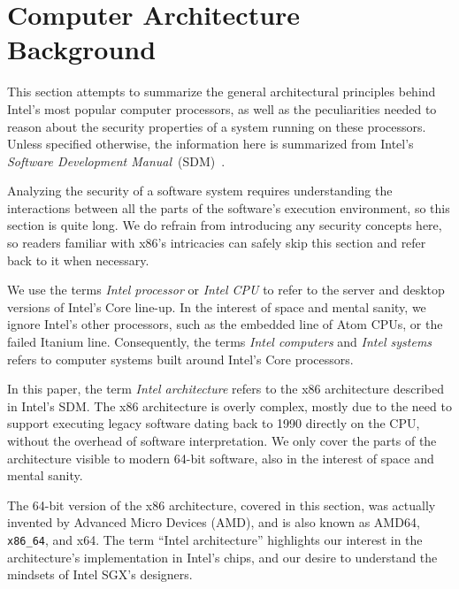 \section{Computer Architecture Background}
\label{sec:architecture_background}

This section attempts to summarize the general architectural principles behind
Intel's most popular computer processors, as well as the peculiarities needed
to reason about the security properties of a system running on these
processors. Unless specified otherwise, the information here is summarized from
Intel's \textit{Software Development Manual}~(SDM)~\cite{intel2015sdm}.

Analyzing the security of a software system requires understanding the
interactions between all the parts of the software's execution environment, so
this section is quite long. We do refrain from introducing any security
concepts here, so readers familiar with x86's intricacies can safely skip this
section and refer back to it when necessary.

We use the terms \textit{Intel processor} or \textit{Intel CPU} to refer to the
server and desktop versions of Intel's Core line-up. In the interest of space
and mental sanity, we ignore Intel's other processors, such as the embedded
line of Atom CPUs, or the failed Itanium line. Consequently, the terms
\textit{Intel computers} and \textit{Intel systems} refers to computer systems
built around Intel's Core processors.

In this paper, the term \textit{Intel architecture} refers to the x86
architecture described in Intel's SDM. The x86 architecture is overly complex,
mostly due to the need to support executing legacy software dating back to 1990
directly on the CPU, without the overhead of software interpretation. We only
cover the parts of the architecture visible to modern 64-bit software, also
in the interest of space and mental sanity.

The 64-bit version of the x86 architecture, covered in this section, was actually
invented by Advanced Micro Devices (AMD), and is also known as AMD64,
\texttt{x86\_64}, and x64. The term ``Intel architecture'' highlights our
interest in the architecture's implementation in Intel's chips, and our desire
to understand the mindsets of Intel SGX's designers.
















